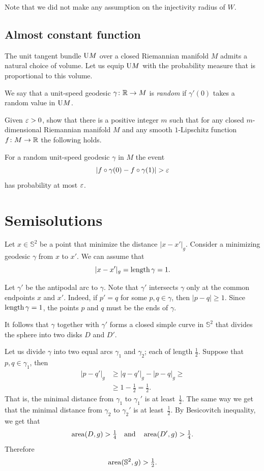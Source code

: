 Note that we did not make any assumption on the injectivity radius of $W$.

\subsection*{Almost constant function}
\label{Almost constant function}

The unit tangent bundle $\mathrm{U} M$ over a closed Riemannian manifold $M$
admits a natural choice of volume.
Let us equip $\mathrm{U} M$ with the probability measure that is proportional to this volume.

We say that a unit-speed geodesic $\gamma\colon\mathbb{R}\to M$ is \emph{random}
if $\gamma'(0)$ takes a random value in $\mathrm{U} M$.

\begin{pr}
Given $\varepsilon>0$,
show that there is a positive integer $m$ such that
for any closed $m$-dimensional Riemannian manifold $M$
and any smooth $1$-Lipschitz function $f\colon M\to\mathbb{R}$ the following holds.

For a random unit-speed geodesic $\gamma$ in $M$ 
the event 
\[|f\circ\gamma(0)-f\circ\gamma(1)|>\eps\]
has probability at most $\varepsilon$.
\end{pr}


\section*{Semisolutions}

Let $x\in \mathbb{S}^2$ be a point that minimize the distance $|x-x'|_g$.
Consider a minimizing geodesic $\gamma$ from $x$ to $x'$.
We can assume that 
\[|x-x'|_g=\operatorname{\rm length} \gamma=1.\]

Let $\gamma'$ be the antipodal arc to $\gamma$.
Note that $\gamma'$ intersects $\gamma$ only at the common endpoints $x$ and $x'$.
Indeed, if $p'=q$ for some $p,q\in\gamma$, then $|p-q|\ge 1$.
Since $\operatorname{\rm length} \gamma=1$, the points $p$ and $q$ must be the ends of $\gamma$.

It follows that $\gamma$ together with $\gamma'$ forms a closed simple curve in $\mathbb{S}^2$
that divides the sphere into two disks $D$ and $D'$.

Let us divide $\gamma$ into two equal arcs $\gamma_1$ and $\gamma_2$; each of length $\tfrac12$.
Suppose that $p,q\in\gamma_1$, then 
\begin{align*}
|p-q'|_g&\ge |q-q'|_g-|p-q|_g\ge
\\
&\ge 1-\tfrac12=\tfrac12.
\end{align*}
That is, the minimal distance from $\gamma_1$ to $\gamma_1'$ is at least~$\tfrac12$.
The same way we get that the minimal distance from $\gamma_2$ to $\gamma_2'$ is at least~$\tfrac12$.
By Besicovitch inequality, we get that 
\[\operatorname{\rm area}\nolimits(D,g)> \tfrac14\quad\text{and}\quad \operatorname{\rm area}\nolimits(D',g)> \tfrac14.\]
Therefore 
\[\operatorname{\rm area}\nolimits(\mathbb{S}^2,g)>\tfrac12.\]
\qedsf

